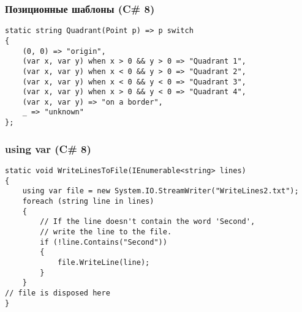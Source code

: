 \documentclass[xetex,mathserif,serif]{beamer}
\begin{document}
	\begin{frame}[fragile]
		\frametitle{Позиционные шаблоны (C\# 8)}
		\begin{verbatim}
static string Quadrant(Point p) => p switch
{
    (0, 0) => "origin",
    (var x, var y) when x > 0 && y > 0 => "Quadrant 1",
    (var x, var y) when x < 0 && y > 0 => "Quadrant 2",
    (var x, var y) when x < 0 && y < 0 => "Quadrant 3",
    (var x, var y) when x > 0 && y < 0 => "Quadrant 4",
    (var x, var y) => "on a border",
    _ => "unknown"
};
		\end{verbatim}
	\end{frame}

	\begin{frame}[fragile]
		\frametitle{using var (C\# 8)}
		\begin{verbatim}
static void WriteLinesToFile(IEnumerable<string> lines)
{
    using var file = new System.IO.StreamWriter("WriteLines2.txt");
    foreach (string line in lines)
    {
        // If the line doesn't contain the word 'Second', 
        // write the line to the file.
        if (!line.Contains("Second"))
        {
            file.WriteLine(line);
        }
    }
// file is disposed here
}
		\end{verbatim}
	\end{frame}
\end{document}
